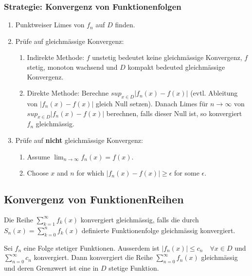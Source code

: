 \documentclass[a4paper,8pt]{extarticle}
\def\sumk{\sum_{k=1}^\infty}
\begin{document}
\subsubsection{Strategie: Konvergenz von Funktionenfolgen}
\begin{enumerate}
  \item Punktweiser Limes von $f_n$ auf $D$ finden.
  \item Prüfe auf gleichmässige Konvergenz:
        \begin{enumerate}[label=\roman*]
          \item Indirekte Methode: $f$ unstetig bedeutet keine
          gleichmässige Konvergenz, $f$ stetig, monoton wachsend
          und $D$ kompakt bedeuted gleichmässige Konvergenz.
          \item Direkte Methode: Berechne $sup_{x \in D} |f_n(x) - f(x)|$ (evtl. Ableitung von $|f_n(x) - f(x)|$ gleich Null setzen).
          Danach Limes für $n \to \infty$ von $sup_{x \in D} |f_n(x) - f(x)|$ berechnen, falls dieser Null ist, so konvergiert $f_n$
          gleichmässig.
        \end{enumerate}
  \item Prüfe auf \textbf{nicht} gleichmässige Konvergenz:
        \begin{enumerate}
          \item Assume $\lim_{n \to \infty} f_n(x) = f(x)$.
          \item Choose $x$ and $n$ for which $|f_n(x) - f(x)| \geq \epsilon$ for some $\epsilon$.
        \end{enumerate}
\end{enumerate} 

\subsection{Konvergenz von FunktionenReihen}
\begin{subbox}{}
  Die Reihe $\sumk f_k(x)$ konvergiert gleichmässig, falls die durch $S_n(x) = \sum_{k=0}^n f_k(x)$ definierte Funktionenfolge gleichmässig konvergiert.
\end{subbox}

\begin{subbox}{}
 Sei $f_n$ eine Folge stetiger Funktionen. Ausserdem ist $|f_n(x)| \le c_n \quad \forall x \in D$ und $\sum_{n=0}^\infty c_n$ konvergiert. Dann konvergiert die Reihe $\sum_{n=0}^\infty f_n(x)$ gleichmässig und deren Grenzwert ist eine in $D$ stetige Funktion.
\end{subbox}
\end{document}
